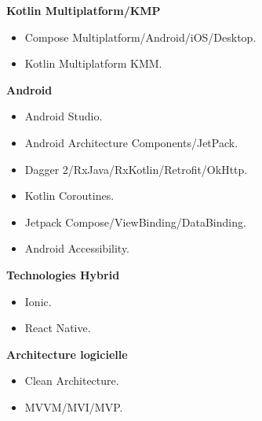 \documentclass[10pt,a4paper,withhyper]{altacv}
\begin{document}
\begin{paracol}{2}








\textbf{Kotlin Multiplatform/KMP}

\begin{itemize}
	\item Compose Multiplatform/Android/iOS/Desktop.
	\item Kotlin Multiplatform KMM.
\end{itemize}
\divider

\textbf{Android}

\begin{itemize}
	\item Android Studio.
	\item Android Architecture Components/JetPack.
	\item Dagger 2/RxJava/RxKotlin/Retrofit/OkHttp.
	\item Kotlin Coroutines.
	\item Jetpack Compose/ViewBinding/DataBinding.
	\item Android Accessibility.
\end{itemize}
\divider

\textbf{Technologies Hybrid }

\begin{itemize}
	\item Ionic.
	\item React Native.
\end{itemize}
\divider

\textbf{Architecture logicielle}

\begin{itemize}
	\item Clean Architecture.
	\item MVVM/MVI/MVP.
\end{itemize}
\divider


\end{paracol}
\end{document}
